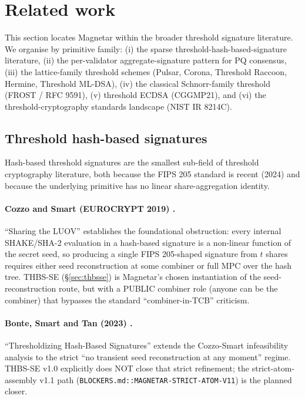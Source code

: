 \section{Related work}
\label{sec:related}

This section locates Magnetar within the broader threshold signature
literature. We organise by primitive family: (i) the sparse
threshold-hash-based-signature literature, (ii) the per-validator
aggregate-signature pattern for PQ consensus, (iii) the
lattice-family threshold schemes (Pulsar, Corona, Threshold Raccoon,
Hermine, Threshold ML-DSA), (iv) the classical Schnorr-family
threshold (FROST / RFC 9591), (v) threshold ECDSA (CGGMP21), and
(vi) the threshold-cryptography standards landscape (NIST IR 8214C).

\subsection{Threshold hash-based signatures}
\label{sec:related:hash}

Hash-based threshold signatures are the smallest sub-field of
threshold cryptography literature, both because the FIPS 205
standard is recent (2024) and because the underlying primitive has
no linear share-aggregation identity.

\paragraph{Cozzo and Smart (EUROCRYPT 2019) \cite{cosmin2021}.}
``Sharing the LUOV'' establishes the foundational obstruction:
every internal SHAKE/SHA-2 evaluation in a hash-based signature is
a non-linear function of the secret seed, so producing a single
FIPS 205-shaped signature from $t$ shares requires either seed
reconstruction at some combiner or full MPC over the hash tree.
THBS-SE (\S\ref{sec:thbsse}) is Magnetar's chosen instantiation of
the seed-reconstruction route, but with a PUBLIC combiner role
(anyone can be the combiner) that bypasses the standard
``combiner-in-TCB'' criticism.

\paragraph{Bonte, Smart and Tan (2023)
\cite{bonte2023threshold}.} ``Thresholdizing Hash-Based
Signatures'' extends the Cozzo-Smart infeasibility analysis to
the strict ``no transient seed reconstruction at any moment''
regime. THBS-SE v1.0 explicitly does NOT close that strict
refinement; the strict-atom-assembly v1.1 path
(\texttt{BLOCKERS.md::MAGNETAR-STRICT-ATOM-V11}) is the planned
closer.

